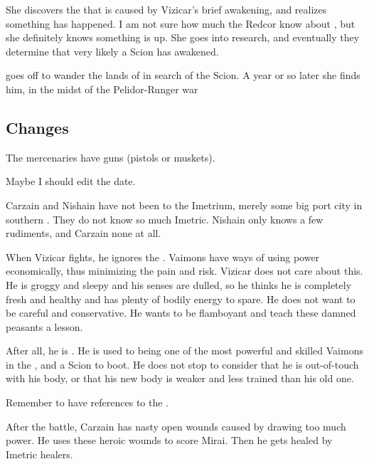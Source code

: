 
She discovers the \vertexspike{} that is caused by Vizicar's brief awakening, and realizes something has happened. I am not sure how much the Redcor know about \vertices, but she definitely knows something is up. She goes into research, and eventually they determine that very likely a Scion has awakened. 

\Esmerel{} goes off to wander the lands of \Velcad{} in search of the Scion. A year or so later she finds him, in the midst of the Pelidor-Runger war\prikker






\subsection{Changes}
The mercenaries have guns (pistols or muskets).

Maybe I should edit the date. 

Carzain and Nishain have not been to the Imetrium, merely some big port city in southern \Scyrum. 
They do not know so much Imetric. 
Nishain only knows a few rudiments, and Carzain none at all. 

When Vizicar fights, he ignores the . 
\Itzach{} Vaimons have ways of using power economically, thus minimizing the pain and risk. 
Vizicar does not care about this. 
He is groggy and sleepy and his senses are dulled, so he thinks he is completely fresh and healthy and has plenty of bodily energy to spare. 
He does not want to be careful and conservative. 
He wants to be flamboyant and teach these damned peasants a lesson. 

After all, he is \VaimonCaliph. 
He is used to being one of the most powerful and skilled Vaimons in the \caliphate, and a Scion to boot. 
He does not stop to consider that he is out-of-touch with his body, or that his new body is weaker and less trained than his old one. 

Remember to have references to the . 

After the battle, Carzain has nasty open wounds caused by drawing too much \qliphah{} power. 
He uses these heroic wounds to score Mirai. 
Then he gets healed by Imetric healers. 

